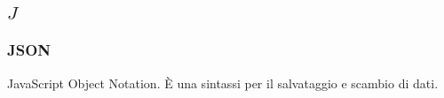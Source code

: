 \subsection*{\quad$J\quad$}
\subsubsection*{JSON}
JavaScript Object Notation. È una sintassi per il salvataggio e scambio di dati. 

